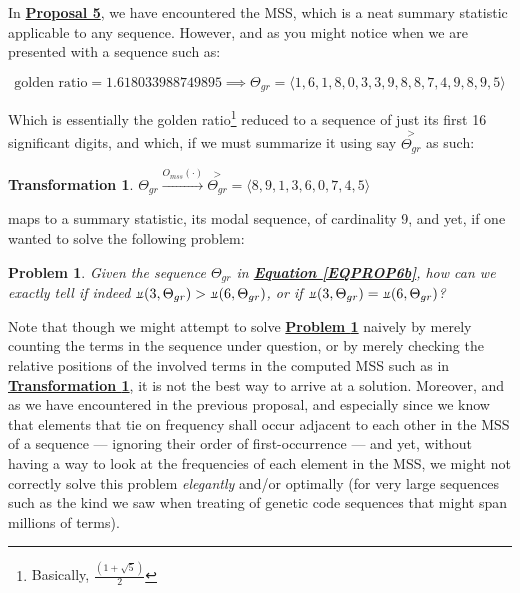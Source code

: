 \documentclass[a4paper, 18pt]{book} %
\newtheorem{trans}{Transformation}
\newtheorem{prob}{Problem}
\newcommand{\invpi}{\rotatebox[origin=c]{180}{$\pi$}}
\begin{document}
In \textbf{\hyperref[PROP5]{Proposal 5}}, we have encountered the MSS, which is a neat summary statistic applicable to any sequence. However, and as you might notice when we are presented with a sequence such as:

\vspace{1em}
\begin{equation}
\label{EQPROP6b}
\text{golden ratio} = 1.618033988749895 \implies \Theta_{gr} = \langle 1, 6, 1, 8, 0, 3, 3, 9, 8, 8, 7, 4, 9, 8, 9, 5 \rangle 
\end{equation}
\vspace{1em}

Which is essentially the golden ratio\footnote{Basically, $\frac{(1 + \sqrt{5})}{2}$} reduced to a sequence of just its first 16 significant digits, and which, if we must summarize it using say $\overset{>}{\Theta_{gr}}$ as such:

\vspace{1em}
\begin{trans}
\label{TRANSMSS1b}
$ \Theta_{gr} \xrightarrow{O_{mss}(\cdot)} \overset{>}{\Theta_{gr}} = \langle 8, 9, 1, 3, 6, 0, 7, 4, 5 \rangle$
\end{trans}
\vspace{1em}

maps to a summary statistic, its modal sequence, of cardinality 9, and yet, if one wanted to solve the following problem:

\vspace{1em}
\begin{prob}
\label{PROBSC1b}
Given the sequence $\Theta_{gr}$ in \textbf{\hyperref[EQPROP6b]{Equation \ref{EQPROP6b}}}, how can we exactly tell if indeed $\invpi(3,\Theta_{gr}) > \invpi(6,\Theta_{gr})$, or if $\invpi(3,\Theta_{gr}) = \invpi(6,\Theta_{gr})$?
\end{prob}
\vspace{1em}


Note that though we might attempt to solve \textbf{\hyperref[PROBSC1b]{Problem \ref{PROBSC1b}}} naively by merely counting the terms in the sequence under question, or by merely checking the relative positions of the involved terms in the computed MSS such as in \textbf{\hyperref[TRANSMSS1b]{Transformation \ref{TRANSMSS1b}}}, it is not the best way to arrive at a solution. Moreover, and as we have encountered in the previous proposal, and especially since we know that elements that tie on frequency shall occur adjacent to each other in the MSS of a sequence --- ignoring their order of first-occurrence --- and yet, without having a way to look at the frequencies of each element in the MSS, we might not correctly solve this problem \textit{elegantly} and/or optimally (for very large sequences such as the kind we saw when treating of genetic code sequences\cite{lutalo_2025_trans_genetics} that might span millions of terms). 
\end{document}
